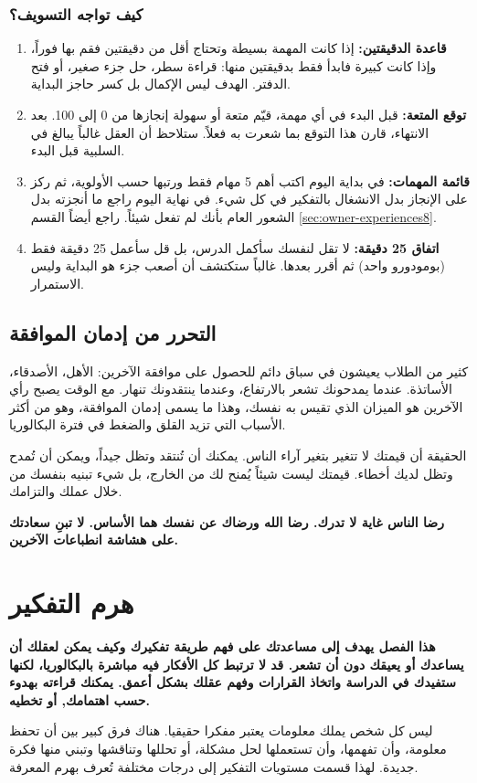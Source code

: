 \documentclass[12pt,a4paper]{book}
\newcommand{\importantAr}[1]{%
	\begin{important}
		\bfseries #1
	\end{important}
}
\begin{document}
	\subsubsection*{كيف تواجه التسويف؟}
	\begin{enumerate}
		\item \textbf{قاعدة الدقيقتين:} إذا كانت المهمة بسيطة وتحتاج أقل من دقيقتين فقم بها فوراً، وإذا كانت كبيرة فابدأ فقط بدقيقتين منها: قراءة سطر، حل جزء صغير، أو فتح الدفتر. الهدف ليس الإكمال بل كسر حاجز البداية.
		
		\item \textbf{توقع المتعة:} قبل البدء في أي مهمة، قيّم متعة أو سهولة إنجازها من 0 إلى 100. بعد الانتهاء، قارن هذا التوقع بما شعرت به فعلاً. ستلاحظ أن العقل غالباً يبالغ في السلبية قبل البدء.
		
		\item \textbf{قائمة المهمات:} في بداية اليوم اكتب أهم 5 مهام فقط ورتبها حسب الأولوية، ثم ركز على الإنجاز بدل الانشغال بالتفكير في كل شيء. في نهاية اليوم راجع ما أنجزته بدل الشعور العام بأنك لم تفعل شيئاً. راجع أيضاً القسم \ref{sec:owner-experiences8}.
		
		\item \textbf{اتفاق 25 دقيقة:} لا تقل لنفسك سأكمل الدرس، بل قل سأعمل 25 دقيقة فقط (بومودورو واحد) ثم أقرر بعدها. غالباً ستكتشف أن أصعب جزء هو البداية وليس الاستمرار.
	\end{enumerate}
	
	\subsection{التحرر من إدمان الموافقة}
	\label{subsec:approval-addiction}
	
	كثير من الطلاب يعيشون في سباق دائم للحصول على موافقة الآخرين: الأهل، الأصدقاء، الأساتذة. عندما يمدحونك تشعر بالارتفاع، وعندما ينتقدونك تنهار. مع الوقت يصبح رأي الآخرين هو الميزان الذي تقيس به نفسك، وهذا ما يسمى إدمان الموافقة، وهو من أكثر الأسباب التي تزيد القلق والضغط في فترة البكالوريا.
	
	الحقيقة أن قيمتك لا تتغير بتغير آراء الناس. يمكنك أن تُنتقد وتظل جيداً، ويمكن أن تُمدح وتظل لديك أخطاء. قيمتك ليست شيئاً يُمنح لك من الخارج، بل شيء تبنيه بنفسك من خلال عملك والتزامك.
	
	\importantAr{رضا الناس غاية لا تدرك. رضا الله ورضاك عن نفسك هما الأساس. لا تبنِ سعادتك على هشاشة انطباعات الآخرين.}

	\section{هرم التفكير}
	\label{sec:bloom-taxonomy-general}
\importantAr{
	هذا الفصل يهدف إلى مساعدتك على فهم طريقة تفكيرك وكيف يمكن لعقلك أن يساعدك أو يعيقك دون أن تشعر. قد لا ترتبط كل الأفكار فيه مباشرة بالبكالوريا، لكنها ستفيدك في الدراسة واتخاذ القرارات وفهم عقلك بشكل أعمق. يمكنك قراءته بهدوء حسب اهتمامك, أو تخطيه.
}
	ليس كل شخص يملك معلومات يعتبر مفكرا حقيقيا. هناك فرق كبير بين أن تحفظ معلومة، وأن تفهمها، وأن تستعملها لحل مشكلة، أو تحللها وتناقشها وتبني منها فكرة جديدة. لهذا قسمت مستويات التفكير إلى درجات مختلفة تُعرف بهرم المعرفة.
	
\end{document}
